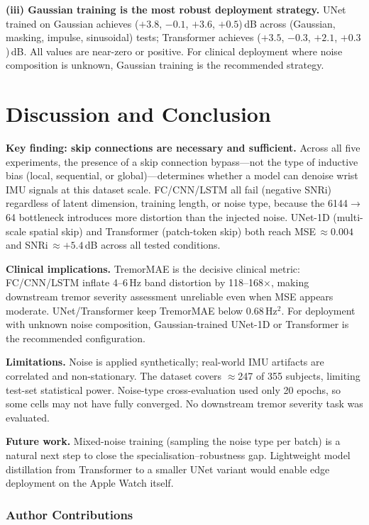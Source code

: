 \documentclass{article}
\begin{document}
\textbf{(iii) Gaussian training is the most robust deployment strategy.}
UNet trained on Gaussian achieves ($+3.8$, $-0.1$, $+3.6$, $+0.5$)\,dB
across (Gaussian, masking, impulse, sinusoidal) tests;
Transformer achieves ($+3.5$, $-0.3$, $+2.1$, $+0.3$)\,dB.
All values are near-zero or positive.
For clinical deployment where noise composition is unknown, Gaussian training
is the recommended strategy.

\section{Discussion and Conclusion}
\label{sec:conclusion}

\textbf{Key finding: skip connections are necessary and sufficient.}
Across all five experiments, the presence of a skip connection bypass---not
the type of inductive bias (local, sequential, or global)---determines whether
a model can denoise wrist IMU signals at this dataset scale.
FC/CNN/LSTM all fail (negative SNRi) regardless of latent dimension, training
length, or noise type, because the 6144$\to$64 bottleneck introduces more
distortion than the injected noise.
UNet-1D (multi-scale spatial skip) and Transformer (patch-token skip) both
reach MSE\,$\approx 0.004$ and SNRi\,$\approx +5.4$\,dB across all tested
conditions.

\textbf{Clinical implications.}
TremorMAE is the decisive clinical metric: FC/CNN/LSTM inflate 4--6\,Hz band
distortion by 118--168$\times$, making downstream tremor severity assessment
unreliable even when MSE appears moderate.
UNet/Transformer keep TremorMAE below 0.68\,Hz$^2$.
For deployment with unknown noise composition, Gaussian-trained UNet-1D or
Transformer is the recommended configuration.

\textbf{Limitations.}
Noise is applied synthetically; real-world IMU artifacts are correlated and
non-stationary.
The dataset covers $\approx$247 of 355 subjects, limiting test-set statistical
power.
Noise-type cross-evaluation used only 20 epochs, so some cells may not have
fully converged.
No downstream tremor severity task was evaluated.

\textbf{Future work.}
Mixed-noise training (sampling the noise type per batch) is a natural next
step to close the specialisation--robustness gap.
Lightweight model distillation from Transformer to a smaller UNet variant
would enable edge deployment on the Apple Watch itself.

\subsubsection*{Author Contributions}
\end{document}
